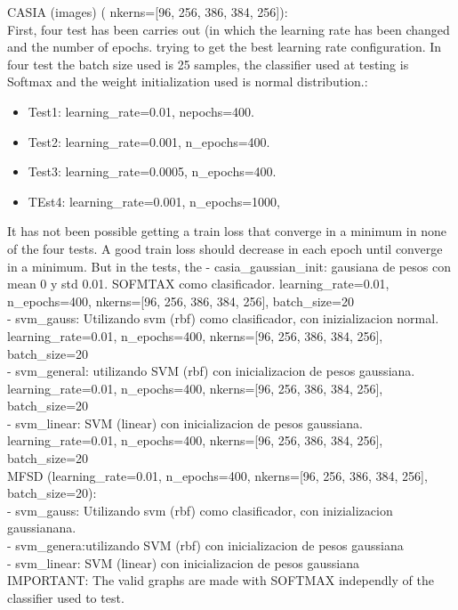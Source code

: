 CASIA (images) ( nkerns=[96, 256, 386, 384, 256]):\\
First, four test has been carries out (in which the learning rate has been changed and the number of epochs. trying to get the best learning rate configuration. In four test the batch size used is 25 samples, the classifier used at testing is Softmax and the weight initialization used is normal distribution.:\\
\begin{itemize}
\item Test1: learning\_rate=0.01, nepochs=400.
\item Test2: learning\_rate=0.001, n\_epochs=400.
\item Test3: learning\_rate=0.0005, n\_epochs=400.
\item TEst4: learning\_rate=0.001, n\_epochs=1000,
\end{itemize}

It has not been possible getting a train loss that converge in a minimum in none of the four tests. A good train loss should decrease in each epoch until converge in a minimum. But in the tests, the
- casia\_gaussian\_init: gausiana de pesos con mean 0 y std 0.01. SOFMTAX como clasificador. learning\_rate=0.01, n\_epochs=400, nkerns=[96, 256, 386, 384, 256], batch\_size=20 \\
- svm\_gauss: Utilizando svm (rbf) como clasificador, con inizializacion normal. learning\_rate=0.01, n\_epochs=400, nkerns=[96, 256, 386, 384, 256], batch\_size=20\\
- svm\_general: utilizando SVM (rbf) con inicializacion de pesos gaussiana. learning\_rate=0.01, n\_epochs=400, nkerns=[96, 256, 386, 384, 256], batch\_size=20\\
- svm\_linear: SVM (linear) con inicializacion de pesos gaussiana. learning\_rate=0.01, n\_epochs=400, nkerns=[96, 256, 386, 384, 256], batch\_size=20\\

MFSD  (learning\_rate=0.01, n\_epochs=400, nkerns=[96, 256, 386, 384, 256], batch\_size=20):\\
- svm\_gauss: Utilizando svm (rbf) como clasificador, con inizializacion gaussianana.\\
- svm\_genera:utilizando SVM (rbf) con inicializacion de pesos gaussiana \\
- svm\_linear: SVM (linear) con inicializacion de pesos gaussiana\\

IMPORTANT: The valid graphs are made with SOFTMAX independly of the classifier used to test.\\

